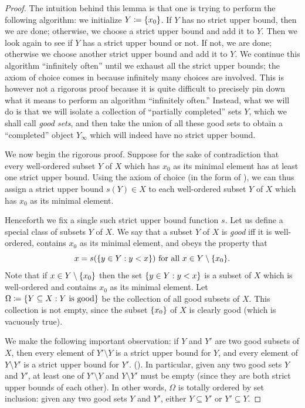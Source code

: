 \begin{proof}
  The intuition behind this lemma is that one is trying to perform the following algorithm:
  we initialize \(Y \coloneqq \left\lbrace x_0\right\rbrace\).
  If \(Y\) has no strict upper bound, then we are done;
  otherwise, we choose a strict upper bound and add it to \(Y\).
  Then we look again to see if \(Y\) has a strict upper bound or not.
  If not, we are done;
  otherwise we choose another strict upper bound and add it to \(Y\).
  We continue this algorithm ``infinitely often'' until we exhaust all the strict upper bounds;
  the axiom of choice comes in because infinitely many choices are involved.
  This is however not a rigorous proof because it is quite difficult to precisely pin down what it means to perform an algorithm ``infinitely often.''
  Instead, what we will do is that we will isolate a collection of ``partially completed'' sets \(Y\), which we shall call \emph{good sets}, and then take the union of all these good sets to obtain a ``completed'' object \(Y_{\infty}\) which will indeed have no strict upper bound.

  We now begin the rigorous proof.
  Suppose for the sake of contradiction that every well-ordered subset \(Y\) of \(X\) which has \(x_0\) as its minimal element has at least one strict upper bound.
  Using the axiom of choice (in the form of ), we can thus assign a strict upper bound \(s(Y) \in X\) to each well-ordered subset \(Y\) of \(X\) which has \(x_0\) as its minimal element.

  Henceforth we fix a single such strict upper bound function \(s\).
  Let us define a special class of subsets \(Y\) of \(X\).
  We say that a subset \(Y\) of \(X\) is \emph{good} iff it is well-ordered, contains \(x_0\) as its minimal element, and obeys the property that
  \[
    x = s(\set{y \in Y : y < x}) \text{ for all } x \in Y \setminus \set{x_0}.
  \]
  Note that if \(x \in Y \setminus \left\lbrace x_0\right\rbrace\) then the set \(\left\lbrace y \in Y : y < x\right\rbrace\) is a subset of \(X\) which is well-ordered and contains \(x_0\) as its minimal element.
  Let \(\Omega \coloneqq \left\lbrace Y \subseteq X : Y \text{ is good}\right\rbrace\) be the collection of all good subsets of \(X\).
  This collection is not empty, since the subset \(\left\lbrace x_0\right\rbrace\) of \(X\) is clearly good
  (which is vacuously true).

  We make the following important observation:
  if \(Y\) and \(Y'\) are two good subsets of \(X\), then every element of \(Y' \setminus Y\) is a strict upper bound for \(Y\), and every element of \(Y \setminus Y'\) is a strict upper bound for \(Y'\).
  ().
  In particular, given any two good sets \(Y\) and \(Y'\), at least one of \(Y' \setminus Y\) and \(Y \setminus Y'\) must be empty
  (since they are both strict upper bounds of each other).
  In other words, \(\Omega\) is totally ordered by set inclusion:
  given any two good sets \(Y\) and \(Y'\), either \(Y \subseteq Y'\) or \(Y' \subseteq Y\).


\end{proof}
